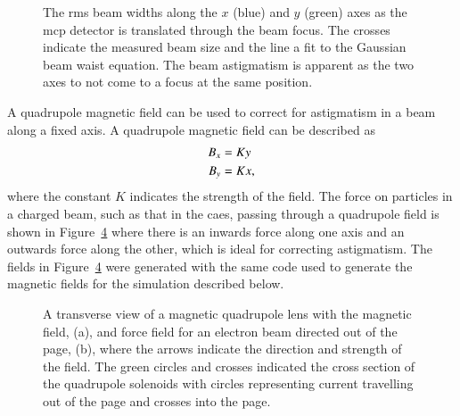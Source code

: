 \begin{figure}
    \centering
    
    \caption{The \gls{rms} beam widths along the $x$ (blue) and $y$ (green) axes as the \gls{mcp} detector is translated through the beam focus.
    The crosses indicate the measured beam size and the line a fit to the Gaussian beam waist equation.
    The beam astigmatism is apparent as the two axes to not come to a focus at the same position.}
    \label{figure:astigmatism_translation}
\end{figure}

A quadrupole magnetic field can be used to correct for astigmatism in a beam along a fixed axis.
A quadrupole magnetic field can be described as
\begin{align}
B_x &= K y \notag\\
B_y &= K x,
\end{align}
where the constant $K$ indicates the strength of the field.
The force on particles in a charged beam, such as that in the \gls{caes}, passing through a quadrupole field is shown in Figure~\ref{figure:quadrupole_example} where there is an inwards force along one axis and an outwards force along the other, which is ideal for correcting astigmatism.
The fields in Figure~\ref{figure:quadrupole_example} were generated with the same code used to generate the magnetic fields for the simulation described below.

\begin{figure}
    \centering
    \begin{subfigure}{0.49\linewidth}
    \centering
    
    \caption{}
    \label{figure:quadrupole_example_field}
    \end{subfigure}
    \begin{subfigure}{0.49\linewidth}
    \centering
    
    \caption{}
    \label{figure:quadrupole_example_force}
    \end{subfigure}
    \caption{A transverse view of a magnetic quadrupole lens with the magnetic field, (a), and force field for an electron beam directed out of the page, (b), where the arrows indicate the direction and strength of the field.
    The green circles and crosses indicated the cross section of the quadrupole solenoids with circles representing current travelling out of the page and crosses into the page.}
    \label{figure:quadrupole_example}
\end{figure}

